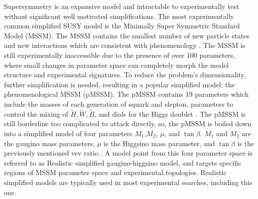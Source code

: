 Supersymmetry is an expansive model and intractable to experimentally test without significant well motivated simplifications. The most experimentally common simplified SUSY model is the Minimally Super Symmetric Standard Model (MSSM). The MSSM contains the smallest number of new particle states and new interactions which are consistent with phenomenology \cite{Baer:2007izw}. The MSSM is still experimentally inaccessible due to the presence of over 100 parameters, where small changes in parameter space can completely morph the model structure and experimental signatures. To reduce the problem's dimensionality, further simplification is needed, resulting in a popular simplified model: the phenomenological MSSM (pMSSM). The pMSSM contains 19 parameters which include the masses of each generation of squark and slepton, parameters to control the mixing of $\tilde{H}, \tilde{W}, \tilde{B}$, and dials for the Higgs doublet \cite{MSSMWorkingGroup:1998fiq}.  The pMSSM is still borderline too complicated to attack directly, so, the pMSSM is boiled down into a simplified model of four parameters $M_1$,$M_2$, $\mu$, and $\tan\beta$. $M_1$ and $M_2$ are the gaugino mass parameters, $\mu$ is the Higgsino mass parameter, and $\tan\beta$ is the previously mentioned vev ratio \cite{Fuks_2018}.  A model point from this four parameter space is referred to as Realistic simplified gaugino-higgsino model, and targets specific regions of MSSM parameter space and experimental topologies. Realistic simplified models are typically used in most experimental searches, including this one.

